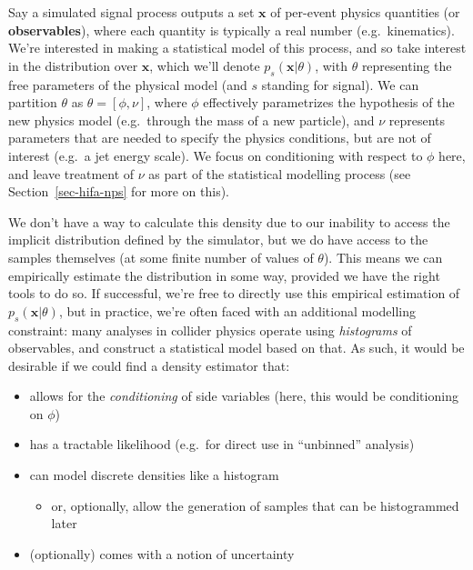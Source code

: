 \documentclass[
  11pt,
  numbers=noendperiod]{book}
\providecommand{\tightlist}{%
  \setlength{\itemsep}{0pt}\setlength{\parskip}{0pt}}\usepackage{longtable,booktabs,array}
\begin{document}
Say a simulated signal process outputs a set \(\mathbf{x}\) of per-event
physics quantities (or \textbf{observables}), where each quantity is
typically a real number (e.g.~kinematics). We're interested in making a
statistical model of this process, and so take interest in the
distribution over \(\mathbf{x}\), which we'll denote
\(p_s(\mathbf{x} | \theta)\), with \(\theta\) representing the free
parameters of the physical model (and \(s\) standing for signal). We can
partition \(\theta\) as \(\theta = [\phi, \nu]\), where \(\phi\)
effectively parametrizes the hypothesis of the new physics model
(e.g.~through the mass of a new particle), and \(\nu\) represents
parameters that are needed to specify the physics conditions, but are
not of interest (e.g.~a jet energy scale). We focus on conditioning with
respect to \(\phi\) here, and leave treatment of \(\nu\) as part of the
statistical modelling process (see Section~\ref{sec-hifa-nps} for more
on this).

We don't have a way to calculate this density due to our inability to
access the implicit distribution defined by the simulator, but we do
have access to the samples themselves (at some finite number of values
of \(\theta\)). This means we can empirically estimate the distribution
in some way, provided we have the right tools to do so. If successful,
we're free to directly use this empirical estimation of
\(p_s(\mathbf{x} | \theta)\), but in practice, we're often faced with an
additional modelling constraint: many analyses in collider physics
operate using \emph{histograms} of observables, and construct a
statistical model based on that. As such, it would be desirable if we
could find a density estimator that:

\begin{itemize}
\tightlist
\item
  allows for the \emph{conditioning} of side variables (here, this would
  be conditioning on \(\phi\))
\item
  has a tractable likelihood (e.g.~for direct use in ``unbinned''
  analysis)
\item
  can model discrete densities like a histogram

  \begin{itemize}
  \tightlist
  \item
    or, optionally, allow the generation of samples that can be
    histogrammed later
  \end{itemize}
\item
  (optionally) comes with a notion of uncertainty
\end{itemize}
\end{document}
